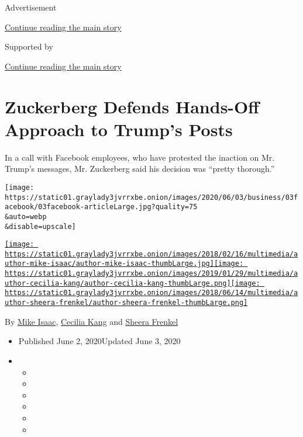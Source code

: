 Advertisement

\protect\hyperlink{after-top}{Continue reading the main story}

Supported by

\protect\hyperlink{after-sponsor}{Continue reading the main story}

\hypertarget{zuckerberg-defends-hands-off-approach-to-trumps-posts}{%
\section{Zuckerberg Defends Hands-Off Approach to Trump's
Posts}\label{zuckerberg-defends-hands-off-approach-to-trumps-posts}}

In a call with Facebook employees, who have protested the inaction on
Mr. Trump's messages, Mr. Zuckerberg said his decision was ``pretty
thorough.''

\texttt{[image: https://static01.graylady3jvrrxbe.onion/images/2020/06/03/business/03facebook/03facebook-articleLarge.jpg?quality=75\\\&auto=webp\\\&disable=upscale]}

\href{https://www.nytimes3xbfgragh.onion/by/mike-isaac}{\texttt{[image: https://static01.graylady3jvrrxbe.onion/images/2018/02/16/multimedia/author-mike-isaac/author-mike-isaac-thumbLarge.jpg]}}\href{https://www.nytimes3xbfgragh.onion/by/cecilia-kang}{\texttt{[image: https://static01.graylady3jvrrxbe.onion/images/2019/01/29/multimedia/author-cecilia-kang/author-cecilia-kang-thumbLarge.png]}}\href{https://www.nytimes3xbfgragh.onion/by/sheera-frenkel}{\texttt{[image: https://static01.graylady3jvrrxbe.onion/images/2018/06/14/multimedia/author-sheera-frenkel/author-sheera-frenkel-thumbLarge.png]}}

By \href{https://www.nytimes3xbfgragh.onion/by/mike-isaac}{Mike Isaac},
\href{https://www.nytimes3xbfgragh.onion/by/cecilia-kang}{Cecilia Kang}
and \href{https://www.nytimes3xbfgragh.onion/by/sheera-frenkel}{Sheera
Frenkel}

\begin{itemize}
\item
  Published June 2, 2020Updated June 3, 2020
\item
  \begin{itemize}
  \item
  \item
  \item
  \item
  \item
  \item
  \end{itemize}
\end{itemize}

